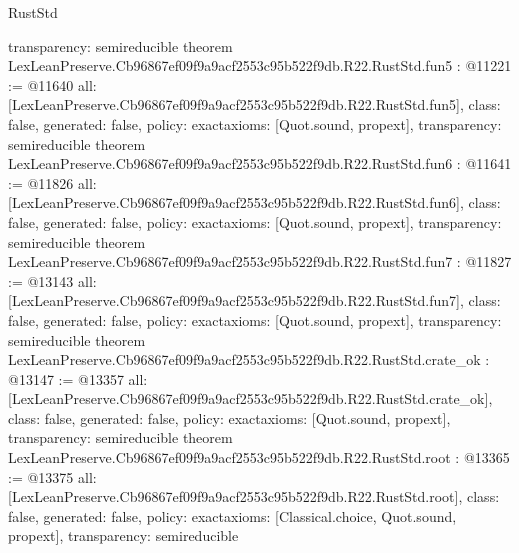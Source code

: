 \begin{lexlean}{RustStd}
\begin{coremodule}
{  transparency: semireducible
}
theorem LexLeanPreserve.Cb96867ef09f9a9acf2553c95b522f9db.R22.RustStd.fun5 : @11221 := @11640 {
  all: [LexLeanPreserve.Cb96867ef09f9a9acf2553c95b522f9db.R22.RustStd.fun5],
  class: false,
  generated: false,
  policy: exact{axioms: [Quot.sound, propext]},
  transparency: semireducible
}
theorem LexLeanPreserve.Cb96867ef09f9a9acf2553c95b522f9db.R22.RustStd.fun6 : @11641 := @11826 {
  all: [LexLeanPreserve.Cb96867ef09f9a9acf2553c95b522f9db.R22.RustStd.fun6],
  class: false,
  generated: false,
  policy: exact{axioms: [Quot.sound, propext]},
  transparency: semireducible
}
theorem LexLeanPreserve.Cb96867ef09f9a9acf2553c95b522f9db.R22.RustStd.fun7 : @11827 := @13143 {
  all: [LexLeanPreserve.Cb96867ef09f9a9acf2553c95b522f9db.R22.RustStd.fun7],
  class: false,
  generated: false,
  policy: exact{axioms: [Quot.sound, propext]},
  transparency: semireducible
}
theorem LexLeanPreserve.Cb96867ef09f9a9acf2553c95b522f9db.R22.RustStd.crate_ok : @13147 := @13357 {
  all: [LexLeanPreserve.Cb96867ef09f9a9acf2553c95b522f9db.R22.RustStd.crate_ok],
  class: false,
  generated: false,
  policy: exact{axioms: [Quot.sound, propext]},
  transparency: semireducible
}
theorem LexLeanPreserve.Cb96867ef09f9a9acf2553c95b522f9db.R22.RustStd.root : @13365 := @13375 {
  all: [LexLeanPreserve.Cb96867ef09f9a9acf2553c95b522f9db.R22.RustStd.root],
  class: false,
  generated: false,
  policy: exact{axioms: [Classical.choice, Quot.sound, propext]},
  transparency: semireducible
}


\end{coremodule}
\end{lexlean}
